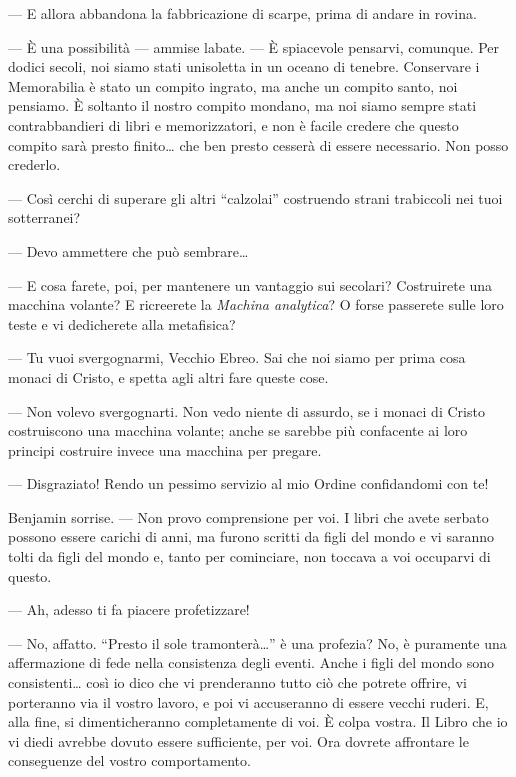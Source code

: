 --- E allora abbandona la fabbricazione di scarpe, prima di andare in
rovina.

--- È una possibilità --- ammise l\textquotesingle abate. --- È
spiacevole pensarvi, comunque. Per dodici secoli, noi siamo stati
un\textquotesingle isoletta in un oceano di tenebre. Conservare i
Memorabilia è stato un compito ingrato, ma anche un compito santo, noi
pensiamo. È soltanto il nostro compito mondano, ma noi siamo sempre
stati contrabbandieri di libri e memorizzatori, e non è facile credere
che questo compito sarà presto finito\ldots{} che ben presto cesserà di
essere necessario. Non posso crederlo.

--- Così cerchi di superare gli altri ``calzolai'' costruendo strani
trabiccoli nei tuoi sotterranei?

--- Devo ammettere che può sembrare\ldots{}

--- E cosa farete, poi, per mantenere un vantaggio sui secolari?
Costruirete una macchina volante? E ricreerete la \emph{Machina
	analytica}? O forse passerete sulle loro teste e vi dedicherete alla
metafisica?

--- Tu vuoi svergognarmi, Vecchio Ebreo. Sai che noi siamo per prima
cosa monaci di Cristo, e spetta agli altri fare queste cose.

--- Non volevo svergognarti. Non vedo niente di assurdo, se i monaci di
Cristo costruiscono una macchina volante; anche se sarebbe più
confacente ai loro principi costruire invece una macchina per pregare.

--- Disgraziato! Rendo un pessimo servizio al mio Ordine confidandomi
con te!

Benjamin sorrise. --- Non provo comprensione per voi. I libri che avete
serbato possono essere carichi di anni, ma furono scritti da figli del
mondo e vi saranno tolti da figli del mondo e, tanto per cominciare, non
toccava a voi occuparvi di questo.

--- Ah, adesso ti fa piacere profetizzare!

--- No, affatto. ``Presto il sole tramonterà\ldots'' è una profezia? No,
è puramente una affermazione di fede nella consistenza degli eventi.
Anche i figli del mondo sono consistenti\ldots{} così io dico che vi
prenderanno tutto ciò che potrete offrire, vi porteranno via il vostro
lavoro, e poi vi accuseranno di essere vecchi ruderi. E, alla fine, si
dimenticheranno completamente di voi. È colpa vostra. Il Libro che io vi
diedi avrebbe dovuto essere sufficiente, per voi. Ora dovrete affrontare
le conseguenze del vostro comportamento.


